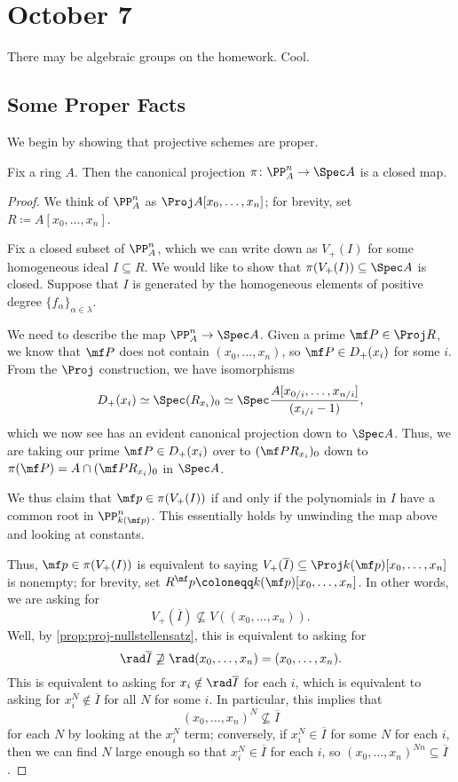 \documentclass[../notes.tex]{subfiles}
\begin{document}
\section{October 7}

There may be algebraic groups on the homework. Cool.

\subsection{Some Proper Facts}
We begin by showing that projective schemes are proper.
\begin{lemma} \label{lem:elim-theory}
	Fix a ring $A$. Then the canonical projection $\pi\colon\PP^n_A\to\Spec A$ is a closed map.
\end{lemma}
\begin{proof}
	We think of $\PP^n_A$ as $\Proj A[x_0,\ldots,x_n]$; for brevity, set $R\coloneqq A[x_0,\ldots,x_n]$.
	
	Fix a closed subset of $\PP^n_A$, which we can write down as $V_+(I)$ for some homogeneous ideal $I\subseteq R$. We would like to show that $\pi(V_+(I))\subseteq\Spec A$ is closed. Suppose that $I$ is generated by the homogeneous elements of positive degree $\{f_\alpha\}_{\alpha\in\lambda}$.

	We need to describe the map $\PP^n_A\to\Spec A$. Given a prime $\mf P\in\Proj R$, we know that $\mf P$ does not contain $(x_0,\ldots,x_n)$, so $\mf P\in D_+(x_i)$ for some $i$. From the $\Proj$ construction, we have isomorphisms
	\[D_+(x_i)\simeq\Spec(R_{x_i})_0\simeq\Spec\frac{A[x_{0/i},\ldots,x_{n/i}]}{(x_{i/i}-1)},\]
	which we now see has an evident canonical projection down to $\Spec A$. Thus, we are taking our prime $\mf P\in D_+(x_i)$ over to $(\mf PR_{x_i})_0$ down to $\pi(\mf P)=A\cap(\mf PR_{x_i})_0$ in $\Spec A$.

	We thus claim that $\mf p\in\pi(V_+(I))$ if and only if the polynomials in $I$ have a common root in $\PP^n_{k(\mf p)}$.\todo{} This essentially holds by unwinding the map above and looking at constants.

	Thus, $\mf p\in\pi(V_+(I))$ is equivalent to saying $V_+(\overline I)\subseteq\Proj k(\mf p)[x_0,\ldots,x_n]$ is nonempty; for brevity, set $R^\mf p\coloneqq k(\mf p)[x_0,\ldots,x_n]$. In other words, we are asking for
	\[V_+(\overline I)\not\subseteq V((x_0,\ldots,x_n)).\]
	Well, by \autoref{prop:proj-nullstellensatz}, this is equivalent to asking for
	\[\rad\overline I\not\supseteq\rad(x_0,\ldots,x_n)=(x_0,\ldots,x_n).\]
	This is equivalent to asking for $x_i\notin\rad\overline I$ for each $i$, which is equivalent to asking for $x_i^N\notin\overline I$ for all $N$ for some $i$. In particular, this implies that
	\[(x_0,\ldots,x_n)^N\not\subseteq\overline I\]
	for each $N$ by looking at the $x_i^N$ term; conversely, if $x_i^N\in\overline I$ for some $N$ for each $i$, then we can find $N$ large enough so that $x_i^N\in\overline I$ for each $i$, so $(x_0,\ldots,x_n)^{Nn}\subseteq\overline I$.


\end{proof}
\end{document}
